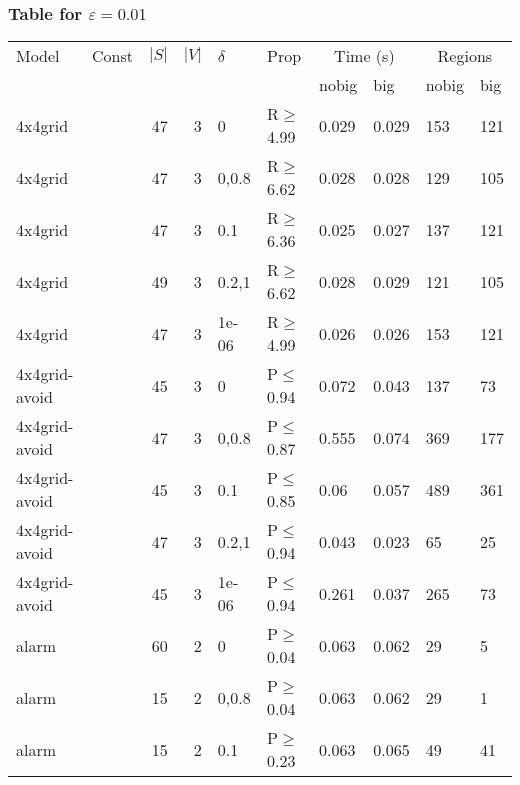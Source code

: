 \subsubsection{Table for \(\varepsilon=0.01\)}
\begin{longtable}{llrrllllll}

        \toprule
        Model & Const & $|S|$ & $|V|$ & $\delta$ & Prop & \multicolumn{2}{c}{Time (s)} & \multicolumn{2}{c}{Regions} \\
        \cmidrule(ll){7-8} \cmidrule(ll){9-10}
        & & & & & & nobig & big & nobig & big \\
        \midrule
        
 4x4grid       &          &     	47 &   3 & 0     & R$\geq$4.99  & 0.029   & 0.029    & 153    & 121    \\
 4x4grid       &          &     	47 &   3 & 0,0.8 & R$\geq$6.62  & 0.028   & 0.028    & 129    & 105    \\
 4x4grid       &          &     	47 &   3 & 0.1   & R$\geq$6.36  & 0.025   & 0.027    & 137    & 121    \\
 4x4grid       &          &     	49 &   3 & 0.2,1 & R$\geq$6.62  & 0.028   & 0.029    & 121    & 105    \\
 4x4grid       &          &     	47 &   3 & 1e-06 & R$\geq$4.99  & 0.026   & 0.026    & 153    & 121    \\
 4x4grid-avoid &          &     	45 &   3 & 0     & P$\leq$0.94  & 0.072   & 0.043    & 137    & 73     \\
 4x4grid-avoid &          &     	47 &   3 & 0,0.8 & P$\leq$0.87  & 0.555   & 0.074    & 369    & 177    \\
 4x4grid-avoid &          &     	45 &   3 & 0.1   & P$\leq$0.85  & 0.06    & 0.057    & 489    & 361    \\
 4x4grid-avoid &          &     	47 &   3 & 0.2,1 & P$\leq$0.94  & 0.043   & 0.023    & 65     & 25     \\
 4x4grid-avoid &          &     	45 &   3 & 1e-06 & P$\leq$0.94  & 0.261   & 0.037    & 265    & 73     \\
 alarm         &          &     	60 &   2 & 0     & P$\geq$0.04  & 0.063   & 0.062    & 29     & 5      \\
 alarm         &          &     	15 &   2 & 0,0.8 & P$\geq$0.04  & 0.063   & 0.062    & 29     & 1      \\
 alarm         &          &     	15 &   2 & 0.1   & P$\geq$0.23  & 0.063   & 0.065    & 49     & 41     \\

\end{longtable}
